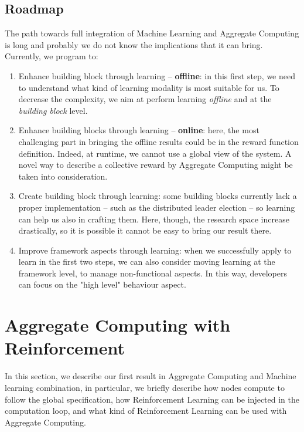 \documentclass[
  twocolumn,
]{ceurart}
\begin{document}
\subsection{Roadmap}
The path towards full integration of Machine Learning and Aggregate Computing is long and probably we do not know the implications that it can bring. 
Currently, we program to:
\begin{enumerate}
  \item Enhance building block through learning -- \textbf{offline}: in this first step, we need to understand what kind of learning modality is most suitable for us. 
  To decrease the complexity, we aim at perform learning \textit{offline} and at the \textit{building block} level.
  \item Enhance building blocks through learning -- \textbf{online}: here, the most challenging part in bringing the offline results could be in the reward function definition. 
  Indeed, at runtime, we cannot use a global view of the system. 
  A novel way to describe a collective reward by Aggregate Computing might be taken into consideration.
  \item Create building block through learning: some building blocks currently lack a proper implementation -- 
  such as the distributed leader election -- so learning can help us also in crafting them. 
  Here, though, the research space increase drastically, so it is possible it cannot be easy to bring our result there.
  \item Improve framework aspects through learning: when we successfully apply to learn in the first two steps, 
  we can also consider moving learning at the framework level, to manage non-functional aspects. In this way,
  developers can focus on the "high level" behaviour aspect.
\end{enumerate}

\section{Aggregate Computing with Reinforcement}
In this section, we describe our first result in Aggregate Computing and Machine learning combination,
 in particular, we briefly describe how nodes compute to follow the global specification,
 how Reinforcement Learning can be injected in the computation loop,
 and what kind of Reinforcement Learning can be used with Aggregate Computing.
\end{document}
